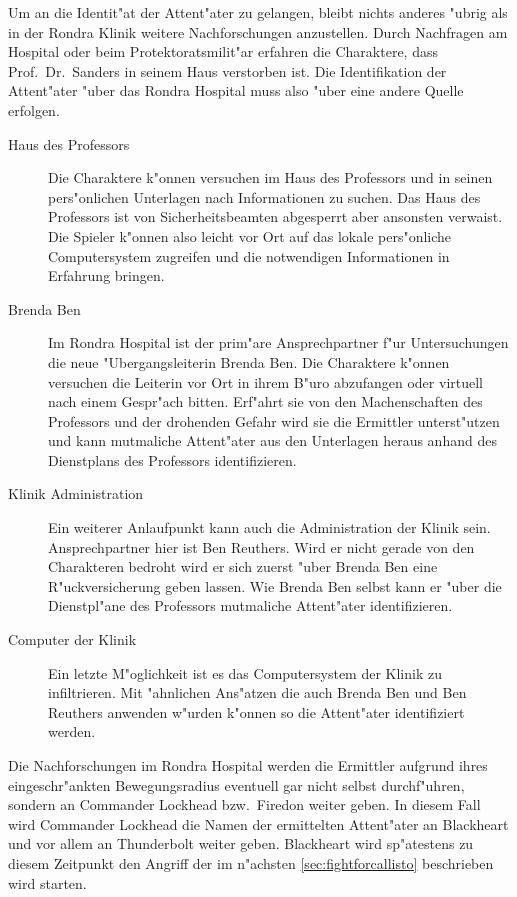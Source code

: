 
 Um an die Identit"at der Attent"ater zu gelangen, bleibt nichts anderes "ubrig als in der Rondra Klinik weitere Nachforschungen anzustellen. Durch Nachfragen am Hospital oder beim Protektoratsmilit"ar erfahren die Charaktere, dass Prof.~Dr.~Sanders in seinem Haus verstorben ist. Die Identifikation der Attent"ater "uber das Rondra Hospital muss also "uber eine andere Quelle erfolgen.

 \begin{description}
	\item [Haus des Professors] Die Charaktere k"onnen versuchen im Haus des Professors und in seinen pers"onlichen Unterlagen nach 
		Informationen zu suchen. Das Haus des Professors ist von Sicherheitsbeamten abgesperrt aber ansonsten verwaist. Die Spieler k"onnen also leicht vor Ort auf das lokale pers"onliche Computersystem zugreifen und die notwendigen Informationen in Erfahrung bringen.
	\item [Brenda Ben] Im Rondra Hospital ist der prim"are Ansprechpartner f"ur Untersuchungen die neue "Ubergangsleiterin Brenda Ben. 
		Die Charaktere k"onnen versuchen die Leiterin vor Ort in ihrem B"uro abzufangen oder virtuell nach einem Gespr"ach bitten. Erf"ahrt sie von den Machenschaften des Professors und der drohenden Gefahr wird sie die Ermittler unterst"utzen und kann mutma\3liche Attent"ater aus den Unterlagen heraus anhand des Dienstplans des Professors identifizieren.
	\item [Klinik Administration] Ein weiterer Anlaufpunkt kann auch die Administration der Klinik sein. Ansprechpartner hier ist Ben 
		Reuthers. Wird er nicht gerade von den Charakteren bedroht wird er sich zuerst "uber Brenda Ben eine R"uckversicherung geben lassen. Wie Brenda Ben selbst kann er "uber die Dienstpl"ane des Professors mutma\3liche Attent"ater identifizieren.
	\item [Computer der Klinik] Ein letzte M"oglichkeit ist es das Computersystem der Klinik zu infiltrieren. Mit "ahnlichen Ans"atzen 
		die auch Brenda Ben und Ben Reuthers anwenden w"urden k"onnen so die Attent"ater identifiziert werden.
 \end{description}

 Die Nachforschungen im Rondra Hospital werden die Ermittler aufgrund ihres eingeschr"ankten Bewegungsradius eventuell gar nicht selbst durchf"uhren, sondern an Commander Lockhead bzw.~Firedon weiter geben. In diesem Fall wird Commander Lockhead die Namen der ermittelten Attent"ater an Blackheart und vor allem an Thunderbolt weiter geben. Blackheart wird sp"atestens zu diesem Zeitpunkt den Angriff der im n"achsten \cref{sec:fightforcallisto} beschrieben wird starten.
